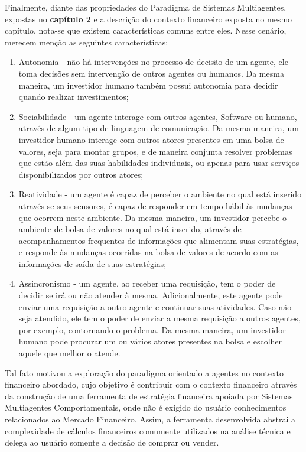 \begin{description}
Finalmente, diante das propriedades do Paradigma de Sistemas Multiagentes, expostas no \textbf{capítulo 2} e a descrição do contexto financeiro exposta no mesmo capítulo, nota-se que existem características comuns entre eles. Nesse cenário, merecem menção as seguintes características:

\begin{enumerate}
\item Autonomia - não há intervenções no processo de decisão de um agente, ele toma decisões sem intervenção de outros agentes ou humanos. Da mesma maneira, um investidor humano também possui autonomia para decidir quando realizar investimentos;

\item Sociabilidade - um agente interage com outros agentes, Software ou humano, através de  algum tipo de linguagem de comunicação. Da mesma maneira, um investidor humano interage com outros atores presentes em uma bolsa de valores, seja para montar grupos, e de maneira conjunta resolver problemas que estão além das suas habilidades individuais, ou apenas para usar serviços disponibilizados por outros atores;

\item Reatividade - um agente é capaz de perceber o ambiente no qual está inserido através se seus sensores, é capaz de responder em tempo hábil às mudanças que ocorrem neste ambiente. Da mesma maneira, um investidor percebe o ambiente de bolsa de valores no qual está inserido, através de acompanhamentos frequentes de informações que alimentam suas estratégias, e responde às mudanças ocorridas na bolsa de valores de acordo com as informações de saída de suas estratégias;
\item Assincronismo -  um agente, ao receber uma requisição, tem o poder de decidir se irá ou não atender à mesma. Adicionalmente, este agente pode enviar uma requisição a outro agente e continuar suas atividades. Caso não seja atendido, ele tem o poder de enviar a mesma requisição a outros agentes, por exemplo, contornando o problema. Da mesma maneira, um investidor humano pode procurar um ou vários atores presentes na bolsa e escolher aquele que melhor o atende.

\end{enumerate}

Tal fato motivou a exploração do paradigma orientado a agentes no contexto financeiro abordado, cujo objetivo é contribuir com o contexto financeiro através da construção de uma ferramenta de estratégia financeira apoiada por Sistemas Multiagentes Comportamentais, onde não é exigido do usuário conhecimentos relacionados ao Mercado Financeiro. Assim, a ferramenta desenvolvida abstrai a complexidade de cálculos financeiros comumente utilizados na análise técnica e delega ao usuário somente a decisão de comprar ou vender.

\end{description}

